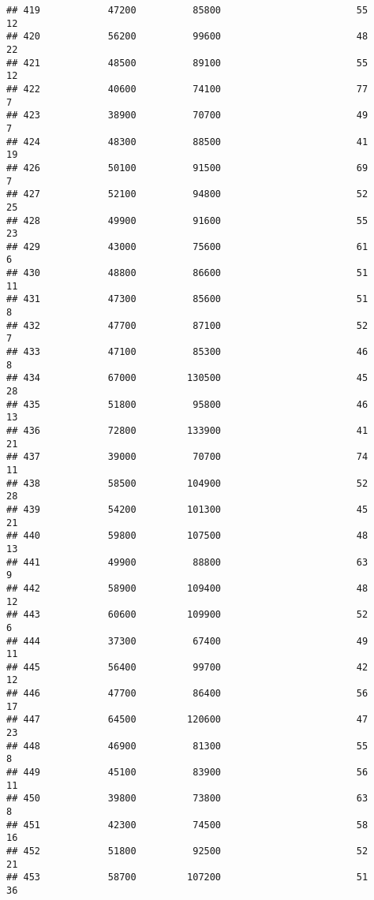 \documentclass[
]{article}
\begin{document}
\begin{verbatim}
## 419            47200          85800                        55           12
## 420            56200          99600                        48           22
## 421            48500          89100                        55           12
## 422            40600          74100                        77            7
## 423            38900          70700                        49            7
## 424            48300          88500                        41           19
## 426            50100          91500                        69            7
## 427            52100          94800                        52           25
## 428            49900          91600                        55           23
## 429            43000          75600                        61            6
## 430            48800          86600                        51           11
## 431            47300          85600                        51            8
## 432            47700          87100                        52            7
## 433            47100          85300                        46            8
## 434            67000         130500                        45           28
## 435            51800          95800                        46           13
## 436            72800         133900                        41           21
## 437            39000          70700                        74           11
## 438            58500         104900                        52           28
## 439            54200         101300                        45           21
## 440            59800         107500                        48           13
## 441            49900          88800                        63            9
## 442            58900         109400                        48           12
## 443            60600         109900                        52            6
## 444            37300          67400                        49           11
## 445            56400          99700                        42           12
## 446            47700          86400                        56           17
## 447            64500         120600                        47           23
## 448            46900          81300                        55            8
## 449            45100          83900                        56           11
## 450            39800          73800                        63            8
## 451            42300          74500                        58           16
## 452            51800          92500                        52           21
## 453            58700         107200                        51           36

\end{verbatim}
\end{document}
